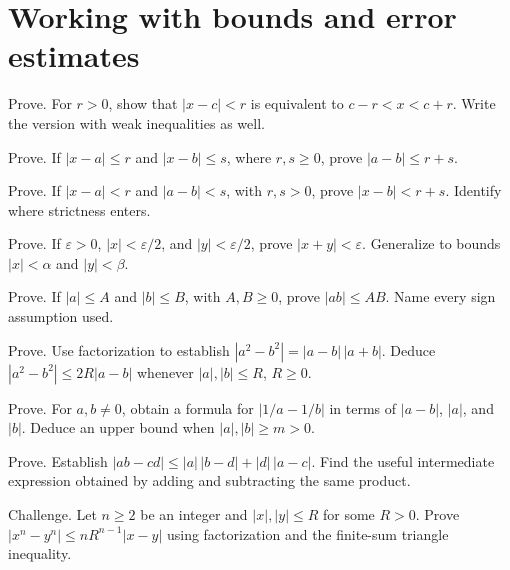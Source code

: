 \documentclass{workbook}
\begin{document}
\section{Working with bounds and error estimates}

\begin{problem}{Prove.}
For $r>0$, show that $|x-c|<r$ is equivalent to $c-r<x<c+r$.
Write the version with weak inequalities as well.
\end{problem}

\begin{problem}{Prove.}
If $|x-a|\leq r$ and $|x-b|\leq s$, where $r,s\geq0$, prove
$|a-b|\leq r+s$.
\end{problem}

\begin{problem}{Prove.}
If $|x-a|<r$ and $|a-b|<s$, with $r,s>0$, prove
$|x-b|<r+s$. Identify where strictness enters.
\end{problem}

\begin{problem}{Prove.}
If $\varepsilon>0$, $|x|<\varepsilon/2$, and
$|y|<\varepsilon/2$, prove $|x+y|<\varepsilon$.
Generalize to bounds $|x|<\alpha$ and $|y|<\beta$.
\end{problem}

\begin{problem}{Prove.}
If $|a|\leq A$ and $|b|\leq B$, with $A,B\geq0$, prove
$|ab|\leq AB$. Name every sign assumption used.
\end{problem}

\begin{problem}{Prove.}
Use factorization to establish
$|a^2-b^2|=|a-b|\,|a+b|$.
Deduce $|a^2-b^2|\leq 2R|a-b|$ whenever
$|a|,|b|\leq R$, $R\geq0$.
\end{problem}

\begin{problem}{Prove.}
For $a,b\neq0$, obtain a formula for $|1/a-1/b|$ in terms of
$|a-b|$, $|a|$, and $|b|$. Deduce an upper bound when
$|a|,|b|\geq m>0$.
\end{problem}

\begin{problem}{Prove.}
Establish
$|ab-cd|\leq |a|\,|b-d|+|d|\,|a-c|$.
Find the useful intermediate expression obtained by adding and
subtracting the same product.
\end{problem}

\begin{problem}{Challenge.}
Let $n\geq2$ be an integer and $|x|,|y|\leq R$ for some $R>0$.
Prove $|x^n-y^n|\leq nR^{n-1}|x-y|$ using factorization and the
finite-sum triangle inequality.
\end{problem}
\end{document}
